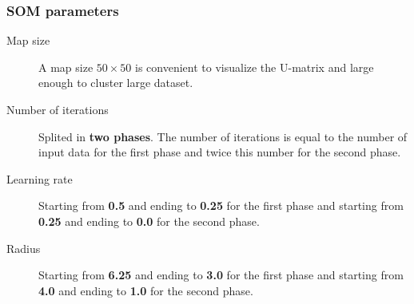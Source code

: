 \begin{frame}
    \frametitle{SOM parameters}
    \begin{description}
        \item[Map size] A map size \textbf{$50 \times 50$} is convenient to visualize the U-matrix and large enough to cluster large dataset.
        \item[Number of iterations] Splited in \textbf{two phases}. The number of iterations is equal to the number of input data for the first phase and twice this number for the second phase.
        \item[Learning rate] Starting from \textbf{0.5} and ending to \textbf{0.25} for the first phase and starting from \textbf{0.25} and ending to \textbf{0.0} for the second phase.
        \item[Radius] Starting from \textbf{6.25} and ending to \textbf{3.0} for the first phase and starting from \textbf{4.0} and ending to \textbf{1.0} for the second phase.
    \end{description}
\end{frame}
